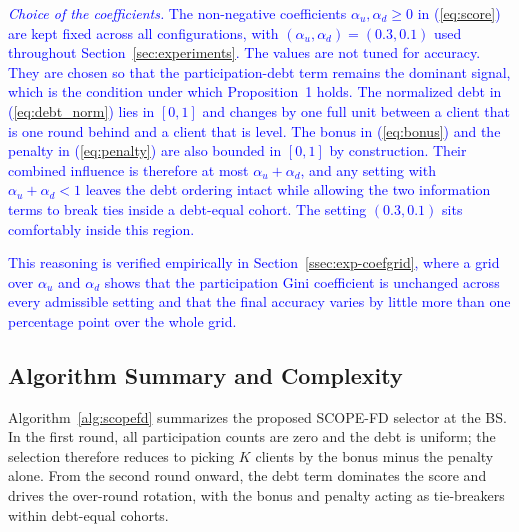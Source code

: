 \documentclass[journal]{IEEEtran}
\newcommand{\rev}[1]{\textcolor{blue}{#1}}
\begin{document}
\rev{\textit{Choice of the coefficients.} The non-negative coefficients $\alpha_u, \alpha_d \ge 0$ in (\ref{eq:score}) are kept fixed across all configurations, with $(\alpha_u, \alpha_d) = (0.3, 0.1)$ used throughout Section~\ref{sec:experiments}. The values are not tuned for accuracy. They are chosen so that the participation-debt term remains the dominant signal, which is the condition under which Proposition~1 holds. The normalized debt in (\ref{eq:debt_norm}) lies in $[0,1]$ and changes by one full unit between a client that is one round behind and a client that is level. The bonus in (\ref{eq:bonus}) and the penalty in (\ref{eq:penalty}) are also bounded in $[0,1]$ by construction. Their combined influence is therefore at most $\alpha_u + \alpha_d$, and any setting with $\alpha_u + \alpha_d < 1$ leaves the debt ordering intact while allowing the two information terms to break ties inside a debt-equal cohort. The setting $(0.3, 0.1)$ sits comfortably inside this region.

This reasoning is verified empirically in Section~\ref{ssec:exp-coefgrid}, where a grid over $\alpha_u$ and $\alpha_d$ shows that the participation Gini coefficient is unchanged across every admissible setting and that the final accuracy varies by little more than one percentage point over the whole grid.}

\subsection{Algorithm Summary and Complexity}
\label{ssec:algorithm-summary}

Algorithm~\ref{alg:scopefd} summarizes the proposed SCOPE-FD selector at the BS. In the first round, all participation counts are zero and the debt is uniform; the selection therefore reduces to picking $K$ clients by the bonus minus the penalty alone. From the second round onward, the debt term dominates the score and drives the over-round rotation, with the bonus and penalty acting as tie-breakers within debt-equal cohorts.
\end{document}
